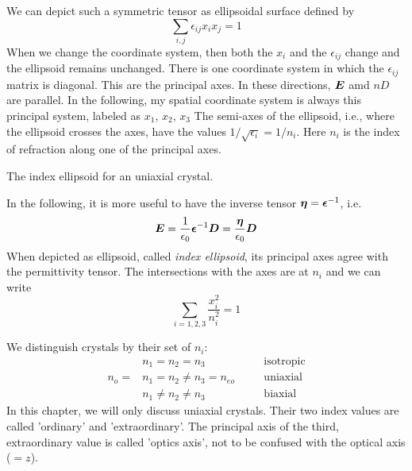 We can depict such a symmetric tensor as ellipsoidal surface defined by 
\begin{equation}
     \sum_{i,j} \epsilon_{i j}  x_i x_j = 1
\end{equation}
When we change the coordinate system, then both the $x_i$ and the $\epsilon_{ij}$ change and the ellipsoid remains unchanged. There is one coordinate system in which the $\epsilon_{ij}$ matrix is diagonal. This are the principal axes.  In these directions, $\boldsymbol{E}$ amd $nD$ are parallel. In the following, my spatial coordinate system is always this principal system, labeled as $x_1$, $x_2$, $x_3$ The semi-axes of the ellipsoid, i.e., where the ellipsoid crosses the axes, have the values $1/\sqrt{\epsilon_i} = 1/n_i$. Here $n_i$ is the index of refraction along one of the principal axes.


\begin{marginfigure}
    \caption{The index ellipsoid for an uniaxial crystal.}
\end{marginfigure}


In the following, it is more useful to have the inverse tensor $\boldsymbol{\eta} = \boldsymbol{\epsilon}^{-1}$, i.e.
\begin{equation}
    \boldsymbol{E} = \frac{1}{\epsilon_0} \boldsymbol{\epsilon}^{-1} \boldsymbol{D}  = \frac{\boldsymbol{\eta}}{\epsilon_0}  \boldsymbol{D}
 \end{equation}
When depicted as ellipsoid, called \emph{index ellipsoid}, its principal axes agree with the permittivity tensor. The intersections with the axes are at $n_i$ and we can write
\begin{equation}
    \sum_{i=1,2,3} \frac{x_i^2}{n_i^2} = 1
\end{equation}



We distinguish crystals by their set of $n_i$:
\begin{align}
          &  n_1 = n_2 = n_3             & & \quad \text{isotropic} \\
 n_{o} = &  n_1 = n_2  \neq n_3  =n_{eo} && \quad \text{uniaxial} \\
           &   n_1 \neq n_2  \neq n_3      & & \quad \text{biaxial} 
\end{align}
In this chapter, we will only discuss  uniaxial crystals. Their two index values are called 'ordinary' and 'extraordinary'. The principal axis of the third, extraordinary value is called 'optics axis', not to be confused with the optical axis ($=z$).



